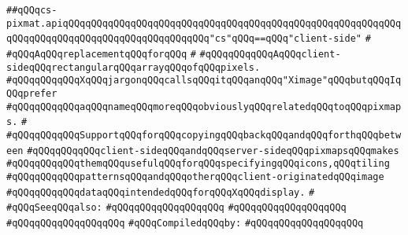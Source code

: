 \label{src/lib/x-kit/xclient/src/window/cs-pixmat.api}
\verb|##qQQqcs-pixmat.apiqQQqqQQqqQQqqQQqqQQqqQQqqQQqqQQqqQQqqQQqqQQqqQQqqQQqqQQqqQQqqQQqqQQqqQQqqQQqqQQqqQQqqQQqqQQqqQQq"cs"qQQq==qQQq"client-side"|\newline
\verb|#|\newline
\verb|#qQQqAqQQqreplacementqQQqforqQQq|\newline
\verb|#|\newline
\verb|#qQQqqQQqqQQqAqQQqclient-sideqQQqrectangularqQQqarrayqQQqofqQQqpixels.|\newline
\verb|#qQQqqQQqqQQqXqQQqjargonqQQqcallsqQQqitqQQqanqQQq"Ximage"qQQqbutqQQqIqQQqprefer|\newline
\verb|#qQQqqQQqqQQqaqQQqnameqQQqmoreqQQqobviouslyqQQqrelatedqQQqtoqQQqpixmaps.|\newline
\verb|#|\newline
\verb|#qQQqqQQqqQQqSupportqQQqforqQQqcopyingqQQqbackqQQqandqQQqforthqQQqbetween|\newline
\verb|#qQQqqQQqqQQqclient-sideqQQqandqQQqserver-sideqQQqpixmapsqQQqmakes|\newline
\verb|#qQQqqQQqqQQqthemqQQqusefulqQQqforqQQqspecifyingqQQqicons,qQQqtiling|\newline
\verb|#qQQqqQQqqQQqpatternsqQQqandqQQqotherqQQqclient-originatedqQQqimage|\newline
\verb|#qQQqqQQqqQQqdataqQQqintendedqQQqforqQQqXqQQqdisplay.|\newline
\verb|#|\newline
\verb|#qQQqSeeqQQqalso:|\newline
\verb|#qQQqqQQqqQQqqQQqqQQq|\newline
\verb|#qQQqqQQqqQQqqQQqqQQq|\newline
\verb|#qQQqqQQqqQQqqQQqqQQq|\newline
\newline
\verb|#qQQqCompiledqQQqby:|\newline
\verb|#qQQqqQQqqQQqqQQqqQQq|\newline
